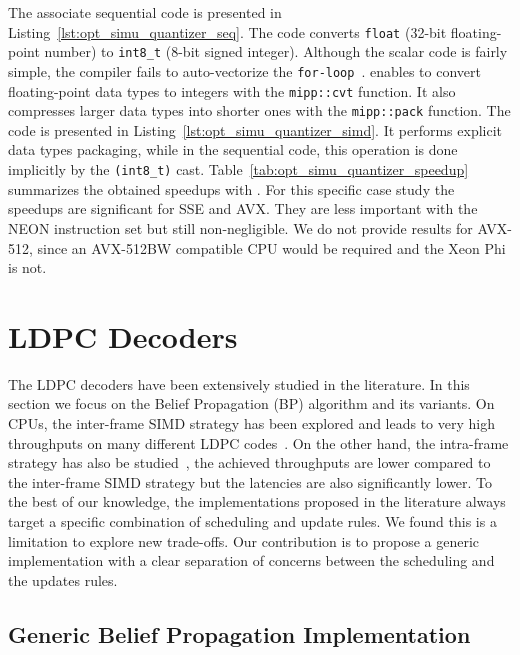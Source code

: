The associate sequential code is presented in
Listing~\ref{lst:opt_simu_quantizer_seq}. The code converts \verb|float| (32-bit
floating-point number) to \verb|int8_t| (8-bit signed integer). Although the
scalar code is fairly simple, the compiler fails to auto-vectorize the
\verb|for-loop|~\cite{Cassagne2018}. \MIPP enables to convert floating-point
data types to integers with the \verb|mipp::cvt| function. It also compresses
larger data types into shorter ones with the \verb|mipp::pack| function. The
\MIPP code is presented in Listing~\ref{lst:opt_simu_quantizer_simd}. It
performs explicit data types packaging, while in the sequential code, this
operation is done implicitly by the \verb|(int8_t)| cast.
Table~\ref{tab:opt_simu_quantizer_speedup} summarizes the obtained speedups with
\MIPP. For this specific case study the speedups are significant for SSE and
AVX. They are less important with the NEON instruction set but still
non-negligible. We do not provide results for AVX-512, since an AVX-512BW
compatible CPU would be required and the Xeon Phi is not.

\section{LDPC Decoders}
\label{sec:opt_ldpc}

The LDPC decoders have been extensively studied in the literature. In this
section we focus on the Belief Propagation (BP) algorithm and its variants. On
CPUs, the inter-frame SIMD strategy has been explored and leads to very high
throughputs on many different LDPC codes~\cite{LeGal2016}. On the other hand,
the intra-frame strategy has also be studied~\cite{LeGal2019a,Xu2019}, the
achieved throughputs are lower compared to the inter-frame SIMD strategy but the
latencies are also significantly lower. To the best of our knowledge, the
implementations proposed in the literature always target a specific combination
of scheduling and update rules. We found this is a limitation to explore new
trade-offs. Our contribution is to propose a generic implementation with a clear
separation of concerns between the scheduling and the updates rules.

\subsection{Generic Belief Propagation Implementation}
\label{sec:opt_ldpc_gen}

